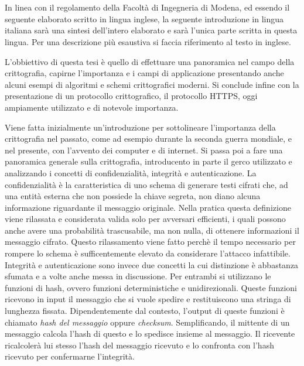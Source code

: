 \chapter*{}
\par
In linea con il regolamento della Facoltà di Ingegneria di Modena, ed essendo il seguente elaborato scritto in lingua inglese, la seguente introduzione in lingua italiana sarà una sintesi dell'intero elaborato e sarà l'unica parte scritta in questa lingua. Per una descrizione più esaustiva si faccia riferimento al testo in inglese.
\par
L'obbiettivo di questa tesi è quello di effettuare una panoramica nel campo della crittografia, capirne l'importanza e i campi di applicazione presentando anche alcuni esempi di algoritmi e schemi crittografici moderni. Si conclude infine con la presentazione di un protocollo crittografico, il protocollo HTTPS, oggi ampiamente utilizzato e di notevole importanza.
\par
Viene fatta inizialmente un'introduzione per sottolineare l'importanza della crittografia nel passato, come ad esempio durante la seconda guerra mondiale, e nel presente, con l'avvento dei computer e di internet. Si passa poi a fare una panoramica generale sulla crittografia, introducento in parte il gerco utilizzato e analizzando i concetti di confidenzialità, integrità e autenticazione. La confidenzialità è la caratteristica di uno schema di generare testi cifrati che, ad una entità esterna che non possiede la chiave segreta, non diano alcuna informazione riguardante il messaggio originale. Nella pratica questa definizione viene rilassata e considerata valida solo per avversari efficienti, i quali possono anche avere una probabilità trascusabile, ma non nulla, di ottenere informazioni il messaggio cifrato. Questo rilassamento viene fatto perchè il tempo necessario per rompere lo schema è sufficentemente elevato da considerare l'attacco infattibile.
 Integrità e autenticazione sono invece due concetti la cui distinzione è abbastanza sfumata e a volte anche messa in discussione. Per entrambi si utilizzano le funzioni di hash, ovvero funzioni deterministiche e unidirezionali. Queste funzioni ricevono in input il messaggio che si vuole spedire e restituiscono una stringa di lunghezza fissata. Dipendentemente dal contesto, l'output di queste funzioni è chiamato \emph{hash del messaggio} oppure \emph{checksum}. Semplificando, il mittente di un messaggio calcola l'hash di questo e lo spedisce insieme al messaggio. Il ricevente ricalcolerà lui stesso l'hash del messaggio ricevuto e lo confronta con l'hash ricevuto per confermarne l'integrità.
